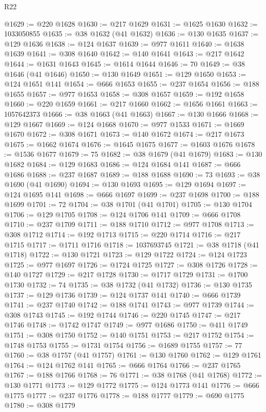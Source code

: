 \begin{lexlean}{R22}
\begin{coremodule}
@1629 := @220 @1628
@1630 := @217 @1629
@1631 := @1625 @1630
@1632 := 1033050855
@1635 := @38 @1632 (@41 @1632)
@1636 := @130 @1635
@1637 := @129 @1636
@1638 := @124 @1637
@1639 := @977 @1611
@1640 := @1638 @1639
@1641 := @308 @1640
@1642 := @140 @1641
@1643 := @217 @1642
@1644 := @1631 @1643
@1645 := @1614 @1644
@1646 := 70
@1649 := @38 @1646 (@41 @1646)
@1650 := @130 @1649
@1651 := @129 @1650
@1653 := @124 @1651 @141
@1654 := @666 @1653
@1655 := @237 @1654
@1656 := @188 @1655
@1657 := @977 @1653
@1658 := @308 @1657
@1659 := @192 @1658
@1660 := @220 @1659
@1661 := @217 @1660
@1662 := @1656 @1661
@1663 := 1057642373
@1666 := @38 @1663 (@41 @1663)
@1667 := @130 @1666
@1668 := @129 @1667
@1669 := @124 @1668
@1670 := @977 @1533
@1671 := @1669 @1670
@1672 := @308 @1671
@1673 := @140 @1672
@1674 := @217 @1673
@1675 := @1662 @1674
@1676 := @1645 @1675
@1677 := @1603 @1676
@1678 := @1536 @1677
@1679 := 75
@1682 := @38 @1679 (@41 @1679)
@1683 := @130 @1682
@1684 := @129 @1683
@1686 := @124 @1684 @141
@1687 := @666 @1686
@1688 := @237 @1687
@1689 := @188 @1688
@1690 := 73
@1693 := @38 @1690 (@41 @1690)
@1694 := @130 @1693
@1695 := @129 @1694
@1697 := @124 @1695 @141
@1698 := @666 @1697
@1699 := @237 @1698
@1700 := @188 @1699
@1701 := 72
@1704 := @38 @1701 (@41 @1701)
@1705 := @130 @1704
@1706 := @129 @1705
@1708 := @124 @1706 @141
@1709 := @666 @1708
@1710 := @237 @1709
@1711 := @188 @1710
@1712 := @977 @1708
@1713 := @308 @1712
@1714 := @192 @1713
@1715 := @220 @1714
@1716 := @217 @1715
@1717 := @1711 @1716
@1718 := 1037693745
@1721 := @38 @1718 (@41 @1718)
@1722 := @130 @1721
@1723 := @129 @1722
@1724 := @124 @1723
@1725 := @977 @1697
@1726 := @1724 @1725
@1727 := @308 @1726
@1728 := @140 @1727
@1729 := @217 @1728
@1730 := @1717 @1729
@1731 := @1700 @1730
@1732 := 74
@1735 := @38 @1732 (@41 @1732)
@1736 := @130 @1735
@1737 := @129 @1736
@1739 := @124 @1737 @141
@1740 := @666 @1739
@1741 := @237 @1740
@1742 := @188 @1741
@1743 := @977 @1739
@1744 := @308 @1743
@1745 := @192 @1744
@1746 := @220 @1745
@1747 := @217 @1746
@1748 := @1742 @1747
@1749 := @977 @1686
@1750 := @411 @1749
@1751 := @308 @1750
@1752 := @140 @1751
@1753 := @217 @1752
@1754 := @1748 @1753
@1755 := @1731 @1754
@1756 := @1689 @1755
@1757 := 77
@1760 := @38 @1757 (@41 @1757)
@1761 := @130 @1760
@1762 := @129 @1761
@1764 := @124 @1762 @141
@1765 := @666 @1764
@1766 := @237 @1765
@1767 := @188 @1766
@1768 := 76
@1771 := @38 @1768 (@41 @1768)
@1772 := @130 @1771
@1773 := @129 @1772
@1775 := @124 @1773 @141
@1776 := @666 @1775
@1777 := @237 @1776
@1778 := @188 @1777
@1779 := @690 @1775
@1780 := @308 @1779

\end{coremodule}
\end{lexlean}
